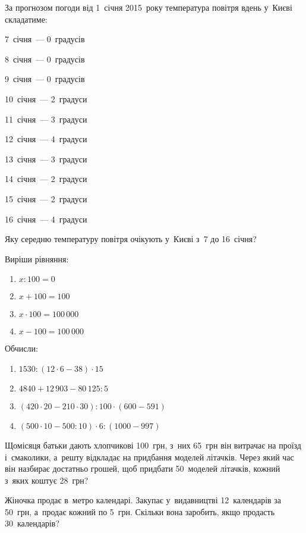 \problem
За прогнозом погоди від 1~січня 2015~року температура повітря вдень
у~Києві складатиме:

\begin{multicols}{2}
    7~січня~--- 0~градусів

    8~січня~--- 0~градусів

    9~січня~--- 0~градусів

    10~січня~--- 2~градуси

    11~січня~--- 3~градуси

    12~січня~--- 4~градуси

    13~січня~--- 3~градуси

    14~січня~--- 2~градуси

    15~січня~--- 2~градуси

    16~січня~--- 4~градуси
\end{multicols}

Яку середню температуру повітря очікують у~Києві з~7 до 16~січня?


\problem
Виріши рівняння:
\begin{multicols}{2}
    \begin{enumerate}
        \item $x : 100 = 0$
        \item $x + 100 = 100$
        \item $x \cdot 100 = 100\,000$
        \item $x - 100 = 100\,000$
    \end{enumerate}
\end{multicols}


\problem
Обчисли:
\begin{enumerate}
    \item $1530 : (12 \cdot 6 - 38) \cdot 15$
    \item $4840 + 12\,903 - 80\,125 : 5$
    \item $(420 \cdot 20 - 210 \cdot 30) : 100 \cdot (600 - 591)$
    \item $(500 \cdot 10 - 500 : 10) \cdot 6 : (1000 - 997)$
\end{enumerate}


\problem
Щомісяця батьки дають хлопчикові 100~грн, з~них 65~грн він витрачає
на проїзд і~смаколики, а~решту відкладає на придбання моделей літачків.
Через який час він назбирає достатньо грошей, щоб придбати 50~моделей літачків,
кожний з~яких коштує 28~грн?


\problem
Жіночка продає в~метро календарі.
Закупає у~видавництві 12~календарів за 50~грн, а~продає кожний по 5~грн.
Скільки вона заробить, якщо продасть 30~календарів?


